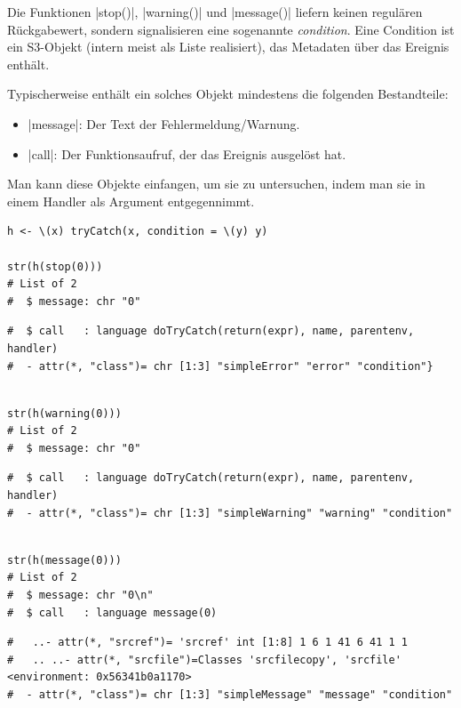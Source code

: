 \documentclass[10pt,twocolumn]{scrartcl}
\renewcommand{\lstinline}{\mycoloredinline}
\begin{document}
Die Funktionen \lstinline|stop()|, \lstinline|warning()| und \lstinline|message()| liefern keinen regulären Rückgabewert, sondern signalisieren eine sogenannte \emph{condition}. Eine Condition ist ein S3-Objekt (intern meist als Liste realisiert), das Metadaten über das Ereignis enthält.

Typischerweise enthält ein solches Objekt mindestens die folgenden Bestandteile:

\begin{itemize}
\item \lstinline|message|: Der Text der Fehlermeldung/Warnung.
\item \lstinline|call|: Der Funktionsaufruf, der das Ereignis ausgelöst hat.
\end{itemize}

Man kann diese Objekte einfangen, um sie zu untersuchen, indem man sie in einem Handler als Argument entgegennimmt.

\begin{lstlisting}
h <- \(x) tryCatch(x, condition = \(y) y)

str(h(stop(0)))
# List of 2
#  $ message: chr "0"
\end{lstlisting}
\begin{lstlisting}[aboveskip=-2pt,basicstyle=\fontsize{8.8pt}{9.5pt}\selectfont\ttfamily]
#  $ call   : language doTryCatch(return(expr), name, parentenv, handler)
#  - attr(*, "class")= chr [1:3] "simpleError" "error" "condition"}
\end{lstlisting}
\begin{lstlisting}[aboveskip=-2pt]

str(h(warning(0)))
# List of 2
#  $ message: chr "0"
\end{lstlisting}
\begin{lstlisting}[aboveskip=-2pt,basicstyle=\fontsize{8.8pt}{9.5pt}\selectfont\ttfamily]
#  $ call   : language doTryCatch(return(expr), name, parentenv, handler)
#  - attr(*, "class")= chr [1:3] "simpleWarning" "warning" "condition"
\end{lstlisting}
\begin{lstlisting}[aboveskip=-2pt]

str(h(message(0)))
# List of 2
#  $ message: chr "0\n"
#  $ call   : language message(0)
\end{lstlisting}
\begin{lstlisting}[aboveskip=-2pt,basicstyle=\ttfamily\scriptsize]
#   ..- attr(*, "srcref")= 'srcref' int [1:8] 1 6 1 41 6 41 1 1
#   .. ..- attr(*, "srcfile")=Classes 'srcfilecopy', 'srcfile' <environment: 0x56341b0a1170> 
#  - attr(*, "class")= chr [1:3] "simpleMessage" "message" "condition"
\end{lstlisting}
\end{document}
